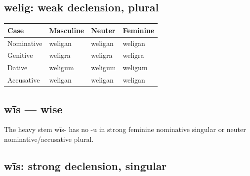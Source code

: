 \subsection*{welig: weak declension, plural}

\par\begingroup
\fontsize{10.5}{13.2}\selectfont
\setlength{\LTleft}{0pt}\setlength{\LTright}{\fill}
\noindent
\begin{tabular}{@{}>{\raggedright\arraybackslash}p{28.89mm}>{\raggedright\arraybackslash}p{28.89mm}>{\raggedright\arraybackslash}p{28.89mm}>{\raggedright\arraybackslash}p{28.89mm}@{}}
\toprule
\textbf{Case} & \textbf{Masculine} & \textbf{Neuter} & \textbf{Feminine} \\
\midrule
Nominative & weligan & weligan & weligan \\
Genitive & weligra & weligra & weligra \\
Dative & weligum & weligum & weligum \\
Accusative & weligan & weligan & weligan \\
\bottomrule
\end{tabular}
\par\endgroup

\subsection*{wīs — wise}

The heavy stem wīs- has no -u in strong feminine nominative singular or neuter nominative/\allowbreak{}accusative plural.

\subsection*{wīs: strong declension, singular}

